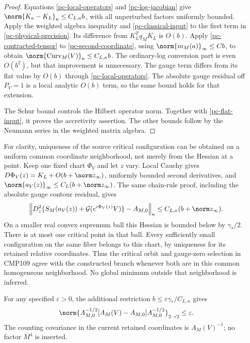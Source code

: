 \begin{proof}
Equations \eqref{pc-local-operators} and
\eqref{pc-log-jacobian} give
$\norm{K_a-K_L}_\kappa\le C_{L,\kappa}b$, with all
unperturbed factors uniformly bounded. Apply the weighted
algebra inequality and \eqref{pc-classical-input} to the
first term in \eqref{pc-physical-precision}. Its difference
from $K_L^Tq_MK_L$ is $O(b)$. Apply
\eqref{pc-contracted-tensor} to
\eqref{pc-second-coordinate}, using
$\norm{m_M(a)}_\infty\le Cb$, to obtain
$\norm{\operatorname{Curv}_M(V)}_\kappa\le C_{L,\kappa}b$.
The ordinary-log conversion part is even $O(b^2)$, but that
improvement is unnecessary. The gauge term differs from its
flat value by $O(b)$ through \eqref{pc-local-operators}.
The absolute gauge residual off $P_V=1$ is a local analytic
$O(b)$ term, so the same bound holds for that extension.

The Schur bound controls the Hilbert operator norm. Together
with \eqref{pc-flat-input}, it proves the accretivity assertion.
The other bounds follow by the Neumann series in the weighted
matrix algebra.
\end{proof}

For clarity, uniqueness of the source critical configuration
can be obtained on a uniform common coordinate neighborhood,
not merely from the Hessian at a point. Keep one fixed chart
$\Phi_V$ and let $z$ vary. Local Cauchy gives
$D\Phi_V(z)=K_L+O(b+\norm z_\infty)$, uniformly bounded
second derivatives, and
$\norm{a_V(z)}_\infty\le C_L(b+\norm z_\infty)$.
The same chain-rule proof, including the absolute gauge
contour residual, gives
\begin{equation}\label{pc-uniform-convexity}
 \left\|D_z^2\{S_M(a_V(z))+
       \mathcal G(e^{i\Phi_V(z)}V)\}-A_{M,0}\right\|_\kappa
       \le C_{L,\kappa}(b+\norm z_\infty).
\end{equation}
On a smaller real convex supremum ball this Hessian is bounded
below by $\gamma_*/2$. There is at most one critical point in
that ball. Every sufficiently small configuration on the same
fiber belongs to this chart, by uniqueness for its retained
relative coordinates. Thus the critical orbit and gauge-zero
selection in CMP109 agree with the constructed branch whenever
both are in this common homogeneous neighborhood. No global
minimum outside that neighborhood is inferred.

For any specified $\varepsilon>0$, the additional restriction
$b\le\varepsilon\gamma_*/C_{L,\kappa}$ gives
\begin{equation}\label{pc-relative-precision}
 \norm{A_{M,0}^{-1/2}[A_M(V)-A_{M,0}]A_{M,0}^{-1/2}}_{2\to2}
       \le\varepsilon.
\end{equation}
The counting covariance in the current retained coordinates
is $A_M(V)^{-1}$; no factor $M^4$ is inserted.

